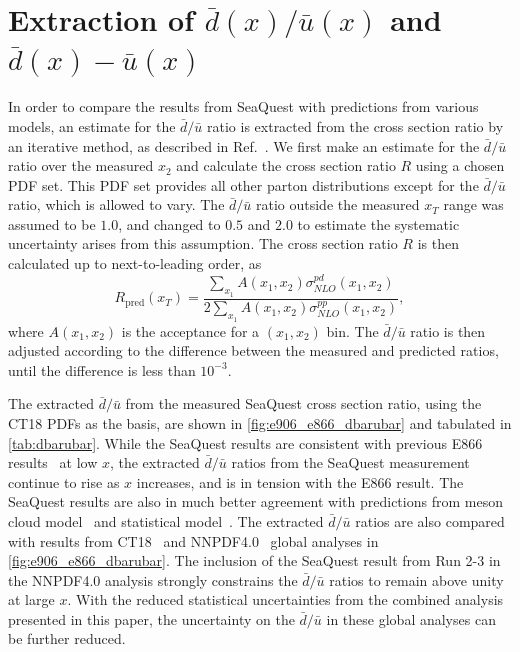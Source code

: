 \documentclass[reprint,aps,unsortedaddress,superscriptaddress,prl,floatfix,showpacs,linenumbers,final]{revtex4-2}
\begin{document}
\section{Extraction of \texorpdfstring{$\bar{d}\left(x\right)/\bar{u}\left(x\right)$}{dbar(x)/ubar(x)}
  and \texorpdfstring{$\bar{d}\left(x\right)-\bar{u}\left(x\right)$}{dbar(x)-ubar(x)}}
\label{sec:extraction}
In order to compare the results from SeaQuest with predictions from various models,
an estimate for the $\bar{d}/\bar{u}$ ratio is extracted from the cross section ratio by
an iterative method, as described in Ref.~\cite{dove2021}.
We first make an estimate for the $\bar{d}/\bar{u}$ ratio over the measured $x_2$
and calculate the cross section ratio $R$ using a chosen PDF set.
This PDF set provides all other parton distributions except for the $\bar{d}/\bar{u}$ ratio,
which is allowed to vary.
The $\bar{d}/\bar{u}$ ratio outside the measured $x_T$ range was assumed to be $1.0$,
and changed to $0.5$ and $2.0$ to estimate the systematic uncertainty arises from this assumption.
The cross section ratio $R$ is then calculated up to next-to-leading order, as
\begin{equation}
	R_{\mathrm{pred}}\left(x_T\right)  = \frac{\sum_{x_1} A\left(x_1, x_2\right)\sigma^{pd}_{NLO}\left(x_1, x_2\right)}{2\sum_{x_1} A\left(x_1, x_2\right)\sigma^{pp}_{NLO}\left(x_1, x_2\right)},
\end{equation}
where $A\left(x_1,x_2\right)$ is the acceptance for a $\left(x_1, x_2\right)$ bin.
The $\bar{d}/\bar{u}$ ratio is then adjusted according to the difference between
the measured and predicted ratios, until the difference is less than $10^{-3}$.

The extracted $\bar{d}/\bar{u}$ from the measured SeaQuest cross section ratio,
using the CT18 PDFs as the basis, are shown in \cref{fig:e906_e866_dbarubar}
and tabulated in \cref{tab:dbarubar}.
While the SeaQuest results are consistent with previous E866 results~\cite{towell2001} at low $x$,
the extracted $\bar{d}/\bar{u}$ ratios from the SeaQuest measurement continue to rise as $x$ increases,
and is in tension with the E866 result.
The SeaQuest results are also in much better agreement with predictions from meson cloud model~\cite{alberg2022}
and statistical model~\cite{soffer2019}.
The extracted $\bar{d}/\bar{u}$ ratios are also compared with results from CT18~\cite{hou2021} and NNPDF4.0~\cite{ball2022a}
global analyses in \cref{fig:e906_e866_dbarubar}.
The inclusion of the SeaQuest result from Run 2-3 in the NNPDF4.0 analysis strongly constrains the $\bar{d}/\bar{u}$ ratios
to remain above unity at large $x$.
With the reduced statistical uncertainties from the combined analysis presented in this paper,
the uncertainty on the $\bar{d}/\bar{u}$ in these global analyses can be further reduced.
\end{document}
